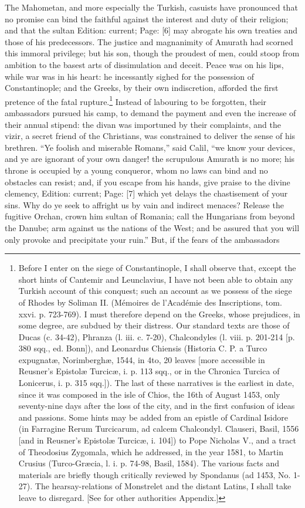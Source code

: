 The Mahometan, and more especially the Turkish, casuists have pronounced that no promise can bind the faithful against the interest and duty of their religion; and that the sultan Edition: current; Page: [6] may abrogate his own treaties and those of his predecessors. The justice and magnanimity of Amurath had scorned this immoral privilege; but his son, though the proudest of men, could stoop from ambition to the basest arts of dissimulation and deceit. Peace was on his lips, while war was in his heart: he incessantly sighed for the possession of Constantinople; and the Greeks, by their own indiscretion, afforded the first pretence of the fatal rupture.\footnote{Before I enter on the siege of Constantinople, I shall observe that, except the short hints of Cantemir and Leunclavius, I have not been able to obtain any Turkish account of this conquest; such an account as we possess of the siege of Rhodes by Soliman II. (Mémoires de l\texthebrew{}’Académie des Inscriptions, tom. xxvi. p. 723-769). I must therefore depend on the Greeks, whose prejudices, in some degree, are subdued by their distress. Our standard texts are those of Ducas (c. 34-42), Phranza (l. iii. c. 7-20), Chalcondyles (l. viii. p. 201-214 [p. 380 sqq., ed. Bonn]), and Leonardus Chiensis (Historia C. P. a Turco expugnatæ, Norimberghæ, 1544, in 4to, 20 leaves [more accessible in Reusner\texthebrew{}’s Epistolæ Turcicæ, i. p. 113 sqq., or in the Chronica Turcica of Lonicerus, i. p. 315 sqq.]). The last of these narratives is the earliest in date, since it was composed in the isle of Chios, the 16th of August 1453, only seventy-nine days after the loss of the city, and in the first confusion of ideas and passions. Some hints may be added from an epistle of Cardinal Isidore (in Farragine Rerum Turcicarum, ad calcem Chalcondyl. Clauseri, Basil, 1556 [and in Reusner\texthebrew{}’s Epistolæ Turcicæ, i. 104]) to Pope Nicholas V., and a tract of Theodosius Zygomala, which he addressed, in the year 1581, to Martin Crusius (Turco-Græcia, l. i. p. 74-98, Basil, 1584). The various facts and materials are briefly though critically reviewed by Spondanus (ad 1453, No. 1-27). The hearsay-relations of Monstrelet and the distant Latins, I shall take leave to disregard. [See for other authorities Appendix.]} Instead of labouring to be forgotten, their ambassadors pursued his camp, to demand the payment and even the increase of their annual stipend: the divan was importuned by their complaints, and the vizir, a secret friend of the Christians, was constrained to deliver the sense of his brethren. \texthebrew{“}Ye foolish and miserable Romans,\texthebrew{}” said Calil, \texthebrew{“}we know your devices, and ye are ignorant of your own danger! the scrupulous Amurath is no more; his throne is occupied by a young conqueror, whom no laws can bind and no obstacles can resist; and, if you escape from his hands, give praise to the divine clemency, Edition: current; Page: [7] which yet delays the chastisement of your sins. Why do ye seek to affright us by vain and indirect menaces? Release the fugitive Orchan, crown him sultan of Romania; call the Hungarians from beyond the Danube; arm against us the nations of the West; and be assured that you will only provoke and precipitate your ruin.\texthebrew{}” But, if the fears of the ambassadors 